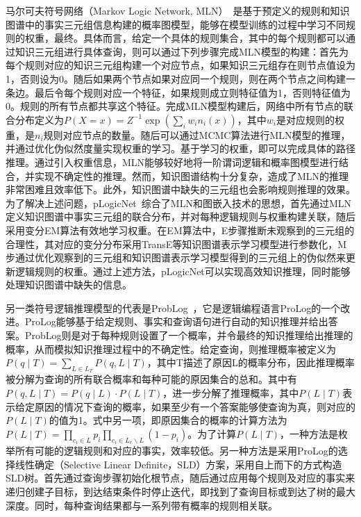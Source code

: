 \documentclass[algorithmlist, AutoFakeBold, AutoFakeSlant, figurelist, tablelist, nomlist, masters]{seuthesix}
\begin{document}
马尔可夫符号网络（Markov Logic Network, MLN）~\cite{richardson2006markov}是基于预定义的规则和知识图谱中的事实三元组信息构建的概率图模型，能够在模型训练的过程中学习不同规则的权重，最终。具体而言，给定一个具体的规则集合，其中的每个规则都可以通过知识三元组进行具体查询，则可以通过下列步骤完成MLN模型的构建：首先为每个规则对应的知识三元组构建一个对应节点，如果知识三元组存在则节点值设为1，否则设为0。随后如果两个节点如果对应同一个规则，则在两个节点之间构建一条边。最后令每个规则对应一个特征，如果规则成立则特征值为1，否则特征值为0。规则的所有节点都共享这个特征。完成MLN模型构建后，网络中所有节点的联合分布定义为$P(X=x)=Z^{-1} \exp \left(\sum_i w_i n_i(x)\right)$，其中$w_i$是对应规则的权重，是$n_i$规则对应节点的数量。随后可以通过MCMC算法进行MLN模型的推理，并通过优化伪似然度量实现权重的学习。基于学习的权重，即可以完成具体的路径推理。通过引入权重信息，MLN能够较好地将一阶谓词逻辑和概率图模型进行结合，并实现不确定性的推理。然而，知识图谱结构十分复杂，造成了MLN的推理非常困难且效率低下。此外，知识图谱中缺失的三元组也会影响规则推理的效果。为了解决上述问题，pLogicNet~\cite{qu2019probabilistic}综合了MLN和图嵌入技术的思想，首先通过MLN定义知识图谱中事实三元组的联合分布，并对每种逻辑规则与权重构建关联，随后采用变分EM算法有效地学习权重。在EM算法中，E步骤推断未观察到的三元组的合理性，其对应的变分分布采用TransE等知识图谱表示学习模型进行参数化，M步通过优化观察到的三元组和知识图谱表示学习模型得到的三元组上的伪似然来更新逻辑规则的权重。通过上述方法，pLogicNet可以实现高效知识推理，同时能够处理知识图谱中缺失的信息。

另一类符号逻辑推理模型的代表是ProbLog~\cite{de2007problog}，它是逻辑编程语言ProLog的一个改进。ProLog能够基于给定规则、事实和查询语句进行自动的知识推理并给出答案。ProbLog则是对于每种规则设置了一个概率，并令最终的知识推理给出推理的概率，从而模拟知识推理过程中的不确定性。给定查询，则推理概率被定义为$P\left(q \mid T\right)=\sum_{L \in L_T} P(q, L \mid T)$，其中T描述了原因L的概率分布，因此推理概率被分解为查询的所有联合概率和每种可能的原因集合的总和。其中有$P(q, L \mid T)=P(q \mid L) \cdot P(L \mid T)$，进一步分解了推理概率，其中$P(L \mid T)$表示给定原因的情况下查询的概率，如果至少有一个答案能够使查询为真，则对应的$P(L \mid T)$的值为1。式中另一项，即原因集合的概率的计算方法为$P(L \mid T)=\prod_{c_i \in L} p_i \prod_{c_i \in L_r \backslash L}\left(1-p_i\right)$。为了计算$P(L \mid T)$，一种方法是枚举所有可能的逻辑规则和对应的事实，效率较低。另一种方法是采用ProLog的选择线性确定（Selective Linear Definite，SLD）方案，采用自上而下的方式构造SLD树。首先通过查询步骤初始化根节点，随后通过应用每个规则及对应的事实来递归创建子目标，到达结束条件时停止迭代，即找到了查询目标或到达了树的最大深度。同时，每种查询结果都与一系列带有概率的规则相关联。
\end{document}
